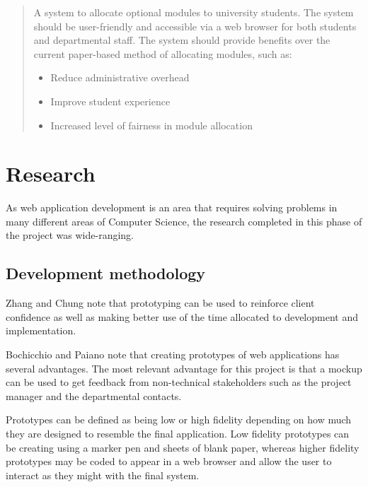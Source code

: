 \documentclass[draft]{scrartcl}
\begin{document}
\begin{quote}
  A system to allocate optional modules to university students. The system
  should be user-friendly and accessible via a web browser for both students
  and departmental staff. The system should provide benefits over the current
  paper-based method of allocating modules, such as:
  \begin{itemize}
    \item Reduce administrative overhead
    \item Improve student experience
    \item Increased level of fairness in module allocation
  \end{itemize}
\end{quote}

% 

\section{Research}
\label{sec:research}


As web application development is an area that requires solving problems in
many different areas of Computer Science, the research completed in this phase
of the project was wide-ranging.

\subsection{Development methodology}



Zhang and Chung \cite{MODFM_2003} note that prototyping can be used to
reinforce client confidence as well as making better use of the time allocated
to development and implementation.

Bochicchio and Paiano \cite{PrototypingWebApplications_2000} note that
creating prototypes of web applications has several advantages.
The most relevant advantage for this project is that a mockup can be used to
get feedback from non-technical stakeholders such as the project manager and
the departmental contacts.

Prototypes can be defined as being low or high fidelity depending on how much
they are designed to resemble the final application. Low fidelity prototypes
can be creating using a marker pen and sheets of blank paper, whereas higher
fidelity prototypes may be coded to appear in a web browser and allow the user
to interact as they might with the final system.
\end{document}
